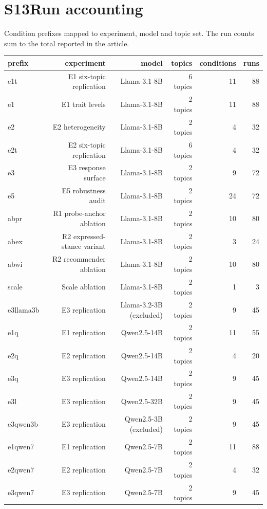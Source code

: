 \documentclass[11pt]{article}
\begin{document}
\section*{S13\quad Run accounting}
Condition prefixes mapped to experiment, model and topic set. The run counts sum to the total reported in the article.
\scriptsize
\setlength{\tabcolsep}{2.5pt}
\begin{longtable}{@{}lrrrrr@{}}
\toprule
prefix & experiment & model & topics & conditions & runs \\
\midrule
\endhead
e1t & E1 six-topic replication & Llama-3.1-8B & 6 topics & 11 & 88 \\
e1 & E1 trait levels & Llama-3.1-8B & 2 topics & 11 & 88 \\
e2 & E2 heterogeneity & Llama-3.1-8B & 2 topics & 4 & 32 \\
e2t & E2 six-topic replication & Llama-3.1-8B & 6 topics & 4 & 32 \\
e3 & E3 response surface & Llama-3.1-8B & 2 topics & 9 & 72 \\
e5 & E5 robustness audit & Llama-3.1-8B & 2 topics & 24 & 72 \\
abpr & R1 probe-anchor ablation & Llama-3.1-8B & 2 topics & 10 & 80 \\
abex & R2 expressed-stance variant & Llama-3.1-8B & 2 topics & 3 & 24 \\
abwi & R2 recommender ablation & Llama-3.1-8B & 2 topics & 10 & 80 \\
scale & Scale ablation & Llama-3.1-8B & 2 topics & 1 & 3 \\
e3llama3b & E3 replication & Llama-3.2-3B (excluded) & 2 topics & 9 & 45 \\
e1q & E1 replication & Qwen2.5-14B & 2 topics & 11 & 55 \\
e2q & E2 replication & Qwen2.5-14B & 2 topics & 4 & 20 \\
e3q & E3 replication & Qwen2.5-14B & 2 topics & 9 & 45 \\
e3l & E3 replication & Qwen2.5-32B & 2 topics & 9 & 45 \\
e3qwen3b & E3 replication & Qwen2.5-3B (excluded) & 2 topics & 9 & 45 \\
e1qwen7 & E1 replication & Qwen2.5-7B & 2 topics & 11 & 88 \\
e2qwen7 & E2 replication & Qwen2.5-7B & 2 topics & 4 & 32 \\
e3qwen7 & E3 replication & Qwen2.5-7B & 2 topics & 9 & 45 \\
\bottomrule
\end{longtable}
\normalsize
\end{document}
